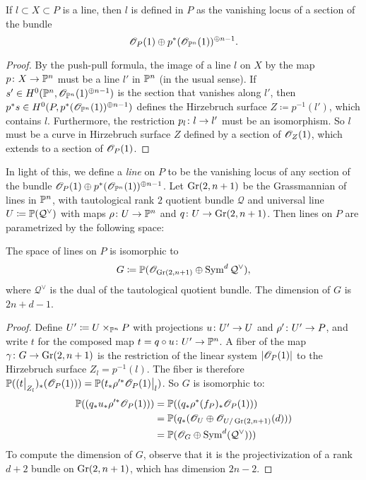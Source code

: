 \begin{proposition}
  If $l \subset X \subset P$ is a line, then $l$ is defined in $P$ as the vanishing locus of a section of the bundle
\[ \sO_P(1) \oplus p^*(\sO_{\P^n}(1))^{\oplus n-1}.\]
\end{proposition}
\begin{proof}
By the push-pull formula, the image of a line $l$ on $X$ by the map $p \from X \to \P^n$ must be a line $l'$ in $\P^n$ (in the usual sense). If $s' \in H^0(\P^n,\sO_{\P^n}(1)^{\oplus n-1})$ is the section that vanishes along $l'$, then $p^*s \in H^0(P,p^*(\sO_{\P^n}(1))^{\oplus n-1})$  defines the Hirzebruch surface $Z \coloneqq p^{-1}(l')$, which contains $l$.  Furthermore, the restriction $p_l \from l \to l'$ must be an isomorphism. So $l$ must be a curve in Hirzebruch surface $Z$ defined by a section of $\sO_Z(1)$, which extends to a section of $\sO_P(1)$.
\end{proof}
In light of this, we define a \emph{line} on $P$ to be the vanishing locus of any section of the bundle $\sO_P(1) \oplus p^*(\sO_{\P^n}(1))^{\oplus n-1}$. Let $\Gr(2,n+1)$ be the Grassmannian of lines in $\P^n$, with tautological rank $2$ quotient bundle $\mathcal{Q}$ and universal line $U \coloneqq \P(\mathcal{Q}^\vee)$ with maps $\rho \from U \to \P^n$ and $q \from U \to \Gr(2,n+1)$. Then lines on $P$ are parametrized by the following space:
\begin{proposition}
The space of lines on $P$ is isomorphic to 
\[ G \coloneqq \P(\sO_{\Gr(2,n+1)} \oplus \Sym^d \mathcal{Q}^\vee),\]
where $\mathcal{Q}^\vee$ is the dual of the tautological quotient bundle. The dimension of $G$ is $2n+d-1$.
\end{proposition}
\begin{proof}
Define $U' \coloneqq U \times_{\P^n} P$ with projections $u \from U' \to U$ and $\rho' \from U' \to P$, and write $t$ for the composed map $t = q \circ u \from U' \to \P^n$. A fiber of the map $\gamma \from G \to \Gr(2,n+1)$ is the restriction of the linear system $\abs{\sO_P(1)}$ to the Hirzebruch surface $Z_l = p^{-1}(l)$. The fiber is therefore $\P((\restr{t}{{Z_l}})_*(\sO_P(1))) = \P(\restr{t_* \rho'^* \sO_P(1)}{l})$. So $G$ is isomorphic to:
\begin{equation}
\label{eq:GBundle}
\begin{split}
\P((q_* u_* \rho'^* \sO_P(1))) &= \P((q_* \rho^* (f_P)_* \sO_P(1)))
\\ &= \P(q_*(\sO_U \oplus \sO_{U/\Gr(2,n+1)}(d))) \\ &= \P(\sO_G \oplus \Sym^d(\mathcal{Q}^\vee)))
\end{split}
\end{equation}
To compute the dimension of $G$, observe that it is the projectivization of a rank $d+2$ bundle on $\Gr(2,n+1)$, which has dimension $2n-2$.
\end{proof}
